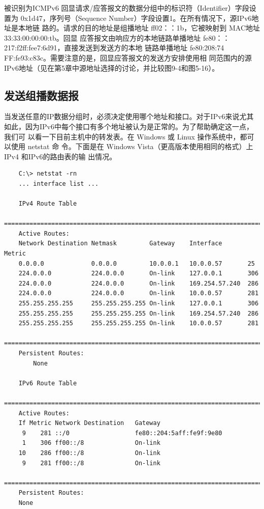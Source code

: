 被识别为ICMPv6 回显请求/应答报文的数据分组中的标识符（Identifier）字段设置为
0x1d47，序列号（Sequence Number）字段设置1。在所有情况下，源IPv6地址是本地链
路的。请求的目的地址是组播地址 ff02：：1b，它被映射到 MAC地址33:33:00:00:00:tb。回显
应答报文由响应方的本地链路单播地址 fe80：：217:f2ff:fee7:6d91，直接发送到发送方的本地
链路单播地址 fe80:208:74 FF:fe93:c83c。需要注意的是，回显应答报文的发送方安排使用相
同范围内的源 IPv6地址（见在第5章中源地址选择的讨论，并比较图9-4和图5-16）。

\subsection{发送组播数据报}
当发送任意的IP数据分组时，必须决定使用哪个地址和接口。对于IPv6来说尤其
如此，因为IPv6中每个接口有多个地址被认为是正常的。为了帮助确定这一点，我们可
以看一下目前主机中的转发表。在 Windows 或 Linux 操作系统中，都可以使用 netstat 命
令。下面是在 Windows Vista（更高版本使用相同的格式）上IPv4 和IPv6的路由表的输
出情况。

\begin{verbatim}
    C:\> netstat -rn
    ... interface list ...

    IPv4 Route Table
    =======================================================================
    Active Routes:
    Network Destination Netmask         Gateway    Interface       Metric
    0.0.0.0             0.0.0.0         10.0.0.1   10.0.0.57       25
    224.0.0.0           224.0.0.0       On-link    127.0.0.1       306
    224.0.0.0           224.0.0.0       On-link    169.254.57.240  286
    224.0.0.0           224.0.0.0       On-link    10.0.0.57       281
    255.255.255.255     255.255.255.255 On-link    127.0.0.1       306
    255.255.255.255     255.255.255.255 On-link    169.254.57.240  286
    255.255.255.255     255.255.255.255 On-link    10.0.0.57       281
    =======================================================================
    Persistent Routes:
        None

    IPv6 Route Table
    =======================================================================
    Active Routes:
    If Metric Network Destination   Gateway
     9    281 ::/0                  fe80::204:5aff:fe9f:9e80
     1    306 ff00::/8              On-link
    10    286 ff00::/8              On-link
     9    281 ff00::/8              On-link
    =======================================================================
    Persistent Routes:
    None
\end{verbatim}

